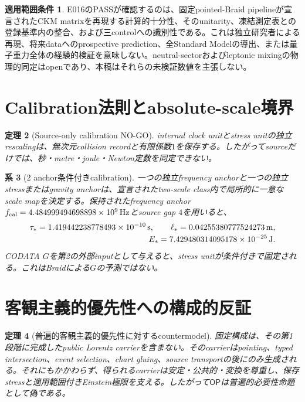 \documentclass[11pt]{article}
\newtheorem{theorem}{定理}[section]
\newtheorem{corollary}[theorem]{系}
\theoremstyle{definition}
\newtheorem{scope}[theorem]{適用範囲条件}
\theoremstyle{remark}
\newcommand{\OPT}{\mathsf{OP}}
\begin{document}
\begin{scope}
E016のPASSが確認するのは、固定pointed-Braid pipelineが宣言されたCKM matrixを再現する計算的十分性、そのunitarity、凍結測定表との登録基準内の整合、および三controlへの識別性である。これは独立研究者による再現、将来dataへのprospective prediction、全Standard Modelの導出、または量子重力全体の経験的検証を意味しない。neutral-sectorおよびleptonic mixingの物理的同定はopenであり、本稿はそれらの未検証数値を主張しない。
\end{scope}

\section{Calibration法則とabsolute-scale境界}

\begin{theorem}[Source-only calibration NO-GO]
internal clock unitとstress unitの独立rescalingは、無次元collision recordと有限係数$1$を保存する。したがってsourceだけでは、秒・metre・joule・Newton定数を同定できない。
\end{theorem}

\begin{corollary}[2 anchor条件付きcalibration]
一つの独立frequency anchorと一つの独立stressまたはgravity anchorは、宣言されたtwo-scale class内で局所的に一意なscale mapを決定する。保持されたfrequency anchor $f_{\rm cal}=4.484999494698898\times10^9\,\mathrm{Hz}$とsource gap $4$を用いると、
\begin{align}
\tau_*=1.419442238778493\times10^{-10}\,\mathrm{s},
\qquad
\ell_*=0.04255380777524273\,\mathrm{m},
\notag\\[-0.15em]
E_*=7.429480314095178\times10^{-25}\,\mathrm{J}.
\end{align}
CODATA $G$を第2の外部inputとして与えると、stress unitが条件付きで固定される。これはBraidによる$G$の予測ではない\cite{codata2022,bipmSI}。
\end{corollary}

\section{客観主義的優先性への構成的反証}

\begin{theorem}[普遍的客観主義的優先性に対するcountermodel]
固定構成は、その第1段階に完成したpublic Lorentz carrierを含まない。そのcarrierはpointing、typed intersection、event selection、chart gluing、source transportの後にのみ生成される。それにもかかわらず、得られるcarrierは安定・公共的・変換を尊重し、保存stressと適用範囲付きEinstein極限を支える。したがって$\OPT$は普遍的必要性命題として偽である。
\end{theorem}
\end{document}
